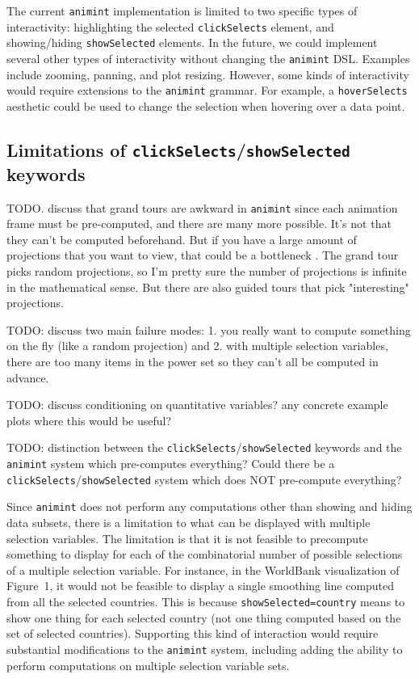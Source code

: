 \documentclass[journal]{vgtc}\usepackage[]{graphicx}\usepackage[]{color}
\begin{document}
The current \texttt{animint} implementation is limited to two specific types of
interactivity: highlighting the selected \texttt{clickSelects}
element, and showing/hiding \texttt{showSelected} elements. In the
future, we could implement several other types of interactivity
without changing the \texttt{animint} DSL. Examples include zooming,
panning, and plot resizing. However, some
kinds of interactivity would require extensions to the \texttt{animint}
grammar. For example, a \texttt{hoverSelects} aesthetic
could be used to change the selection when hovering over a data point.

\subsection{Limitations of \texttt{clickSelects}/\texttt{showSelected} keywords}

TODO. discuss that grand tours are awkward in \texttt{animint} since each
animation frame must be pre-computed, and there are many more possible.
It's not that they can't be computed beforehand. But if you have a
large amount of projections that you want to view, that could be a
bottleneck \citep{tourr}. The grand tour picks random projections, so
I'm pretty sure the number of projections is infinite in the
mathematical sense. But there are also guided tours that pick
"interesting" projections.

TODO: discuss two main failure modes: 1. you really want to compute
something on the fly (like a random projection) and 2. with multiple
selection variables, there are too many items in the power set so they
can't all be computed in advance.

TODO: discuss conditioning on quantitative variables? any concrete
example plots where this would be useful?

TODO: distinction between the \texttt{clickSelects}/\texttt{showSelected} keywords and
the \texttt{animint} system which pre-computes everything? Could there be a
\texttt{clickSelects}/\texttt{showSelected} system which does NOT pre-compute
everything?

Since \texttt{animint} does not perform any computations other than showing and
hiding data subsets, there is a limitation to what can be
displayed with multiple selection variables.
The limitation is that it is not feasible to precompute
something to display for each of the combinatorial number of
possible selections
of a multiple selection variable.
For instance, in the
WorldBank visualization of Figure~1, it would not be feasible to
display a single smoothing line computed from all the selected
countries. This is because \texttt{showSelected=country} means to show
one thing for each selected country (not one thing computed based on
the set of selected countries). Supporting this kind of interaction
would require substantial modifications to the \texttt{animint} system,
including adding the ability to perform computations on
multiple selection variable sets.
\end{document}
